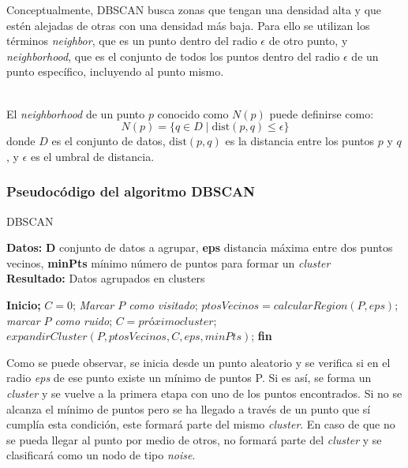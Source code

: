 Conceptualmente, \gls{DBSCAN} busca zonas que tengan una densidad alta y que estén alejadas de otras con una densidad más baja. 
Para ello se utilizan los términos \textit{neighbor}, que es un punto dentro del radio $\epsilon$ de otro punto, y \textit{neighborhood}, que es el conjunto de todos los puntos dentro del radio $\epsilon$ de un punto específico, incluyendo al punto mismo. \\

\begin{definition}
\shorthrule \vspace{0.1cm}
\\
El \textit{neighborhood} de un punto \( p \) conocido como \( N(p) \) puede definirse como:
\[
N(p) = \{ q \in D \mid \text{dist}(p, q) \leq \epsilon \}
\]
donde \( D \) es el conjunto de datos, \(\text{dist}(p, q)\) es la distancia entre los puntos \( p \) y \( q \), y \( \epsilon \) es el umbral de distancia.
\\ \vspace{0.1cm}
\fullhrule
\end{definition}

\subsubsection*{Pseudocódigo del algoritmo DBSCAN}

\begin{algorithm}[H]
\footnotesize
\caption{DBSCAN}
\textbf{Datos:} \textbf{D} conjunto de datos a agrupar, \textbf{eps} distancia máxima entre dos puntos vecinos, \textbf{minPts} mínimo número de puntos para formar un \textit{cluster}\\
\textbf{Resultado:} Datos agrupados en clusters
\begin{algorithmic}[1]
\State \textbf{Inicio;}
\State $C = 0$;
        \State \textit{Marcar $P$ como visitado};
        \State $ptosVecinos = calcularRegion(P, eps)$;
            \State \textit{marcar $P$ como ruido};
        \Else
            \State $C = próximo cluster$;
            \State $expandirCluster(P, ptosVecinos, C, eps, minPts)$;
        \EndIf
    \EndIf
\EndFor
\State \textbf{fin}
\end{algorithmic}
\end{algorithm}

Como se puede observar, se inicia desde un punto aleatorio y se verifica si en el radio \textit{eps} de ese punto existe un mínimo de puntos P. Si es así, se forma un \textit{cluster} y se vuelve a la primera etapa con uno de los puntos encontrados. Si no se alcanza el mínimo de puntos pero se ha llegado a través de un punto que sí cumplía esta condición, este formará parte del mismo \textit{cluster}. En caso de que no se pueda llegar al punto por medio de otros, no formará parte del \textit{cluster} y se clasificará como un nodo de tipo \textit{noise}.

